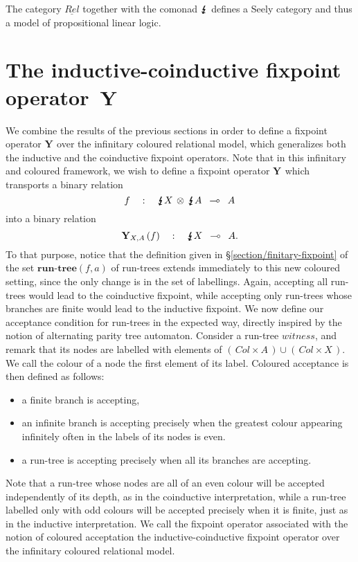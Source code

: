 \documentclass[runningheads,a4paper]{llncs}
\newcommand{\colorbang}{\lightning\hspace{-.5765em}\lightning\hspace{-.5765em}\lightning}
\newcommand{\Relinfinitary}{\underline{Rel}}
\newcommand{\runtree}[2]{\textbf{run-tree}(#1,#2)}
\newcommand{\tree}{\textit{witness}}
\newcommand{\fixpoint}[1]{\textbf{Y}_{#1}}
\begin{document}
\begin{theorem}
The category $\Relinfinitary$ together with the comonad $\colorbang$
defines a Seely category and thus a model of propositional linear logic.
\end{theorem}

\section{The inductive-coinductive fixpoint operator~$\fixpoint{}$}
\label{section/y-colore}
We combine the results of the previous sections
in order to define a fixpoint operator $\fixpoint{}$ over the infinitary coloured relational model, 
which generalizes both the inductive and the coinductive fixpoint operators.
Note that in this infinitary and coloured framework,
we wish to define a fixpoint operator $\fixpoint{}$ which transports a binary relation
$$
f\quad : \quad\colorbang X \, \otimes \, \colorbang A \,\,\, \multimap \,\,\, A
$$
into a binary relation
$$
\fixpoint{X,A}\,(f) \quad : \quad \colorbang X \,\,\, \multimap \,\,\, A.
$$
To that purpose, notice that the definition given in \S\ref{section/finitary-fixpoint}
of the set $\runtree{f}{a}$ of run-trees
extends immediately to this new coloured setting, since the only change is in the set of labellings. 
Again, accepting all run-trees would lead to the coinductive fixpoint, while accepting only run-trees whose branches are finite 
would lead to the inductive fixpoint. 
We now define our acceptance condition for run-trees in the expected way, 
directly inspired by the notion of alternating parity tree automaton.
Consider a run-tree $\tree$, and remark that its nodes are labelled with elements 
of $(\,Col \times A \,) \cup (\,Col \times X\,)$. 
We call the colour of a node the first element of its label. Coloured acceptance is then defined as follows:
\begin{itemize}
\item a finite branch is accepting,
\item an infinite branch is accepting precisely when the greatest colour appearing infinitely often in the labels of its nodes is even.
\item a run-tree is accepting precisely when all its branches are accepting.
\end{itemize}
Note that a run-tree whose nodes are all of an even colour will be accepted independently of its depth, 
as in the coinductive interpretation, while a run-tree labelled only with odd colours will be accepted 
precisely when it is finite, just as in the inductive interpretation. 
We call the fixpoint operator associated with the notion of coloured acceptation 
the inductive-coinductive fixpoint operator over the infinitary coloured relational model.
\end{document}
